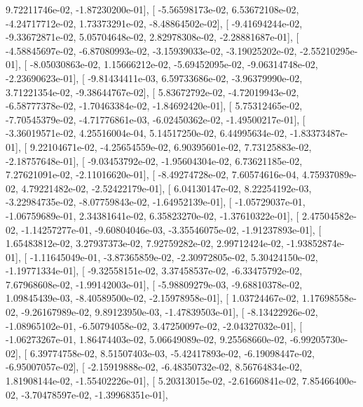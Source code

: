 \documentclass{article}
\begin{document}
          9.72211746e-02,  -1.87230200e-01],
       [ -5.56598173e-02,   6.53672108e-02,  -4.24717712e-02,
          1.73373291e-02,  -8.48864502e-02],
       [ -9.41694244e-02,  -9.33672871e-02,   5.05704648e-02,
          2.82978308e-02,  -2.28881687e-01],
       [ -4.58845697e-02,  -6.87080993e-02,  -3.15939033e-02,
         -3.19025202e-02,  -2.55210295e-01],
       [ -8.05030863e-02,   1.15666212e-02,  -5.69452095e-02,
         -9.06314748e-02,  -2.23690623e-01],
       [ -9.81434411e-03,   6.59733686e-02,  -3.96379990e-02,
          3.71221354e-02,  -9.38644767e-02],
       [  5.83672792e-02,  -4.72019943e-02,  -6.58777378e-02,
         -1.70463384e-02,  -1.84692420e-01],
       [  5.75312465e-02,  -7.70545379e-02,  -4.71776861e-03,
         -6.02450362e-02,  -1.49500217e-01],
       [ -3.36019571e-02,   4.25516004e-04,   5.14517250e-02,
          6.44995634e-02,  -1.83373487e-01],
       [  9.22104671e-02,  -4.25654559e-02,   6.90395601e-02,
          7.73125883e-02,  -2.18757648e-01],
       [ -9.03453792e-02,  -1.95604304e-02,   6.73621185e-02,
          7.27621091e-02,  -2.11016620e-01],
       [ -8.49274728e-02,   7.60574616e-04,   4.75937089e-02,
          4.79221482e-02,  -2.52422179e-01],
       [  6.04130147e-02,   8.22254192e-03,  -3.22984735e-02,
         -8.07759843e-02,  -1.64952139e-01],
       [ -1.05729037e-01,  -1.06759689e-01,   2.34381641e-02,
          6.35823270e-02,  -1.37610322e-01],
       [  2.47504582e-02,  -1.14257277e-01,  -9.60804046e-03,
         -3.35546075e-02,  -1.91237893e-01],
       [  1.65483812e-02,   3.27937373e-02,   7.92759282e-02,
          2.99712424e-02,  -1.93852874e-01],
       [ -1.11645049e-01,  -3.87365859e-02,  -2.30972805e-02,
          5.30424150e-02,  -1.19771334e-01],
       [ -9.32558151e-02,   3.37458537e-02,  -6.33475792e-02,
          7.67968608e-02,  -1.99142003e-01],
       [ -5.98809279e-03,  -9.68810378e-02,   1.09845439e-03,
         -8.40589500e-02,  -2.15978958e-01],
       [  1.03724467e-02,   1.17698558e-02,  -9.26167989e-02,
          9.89123950e-03,  -1.47839503e-01],
       [ -8.13422926e-02,  -1.08965102e-01,  -6.50794058e-02,
          3.47250097e-02,  -2.04327032e-01],
       [ -1.06273267e-01,   1.86474403e-02,   5.06649089e-02,
          9.25568660e-02,  -6.99205730e-02],
       [  6.39774758e-02,   8.51507403e-03,  -5.42417893e-02,
         -6.19098447e-02,  -6.95007057e-02],
       [ -2.15919888e-02,  -6.48350732e-02,   8.56764834e-02,
          1.81908144e-02,  -1.55402226e-01],
       [  5.20313015e-02,  -2.61660841e-02,   7.85466400e-02,
         -3.70478597e-02,  -1.39968351e-01],
\end{document}
